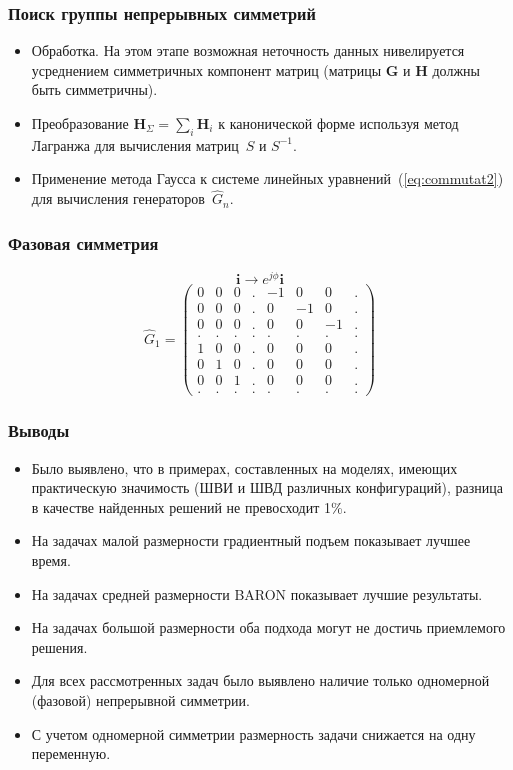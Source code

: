 \begin{frame}
    \frametitle{Поиск группы непрерывных симметрий}
    \begin{itemize}
      \item Обработка. На этом этапе возможная неточность данных нивелируется усреднением симметричных компонент матриц (матрицы $\textbf{G}$ и $\textbf{H}$ должны быть симметричны).
      \item %
      Преобразование $ {\textbf{H}}_{\Sigma} = \sum_{i} \textbf{H}_i$ к канонической форме используя метод Лагранжа для вычисления матриц~$S$ и $S^{-1} $.
      \item Применение метода Гаусса к системе линейных уравнений~(\ref{eq:commutat2}) для вычисления генераторов~$\hat{G}_n$.
    \end{itemize}
\end{frame}

\begin{frame}
    \frametitle{Фазовая симметрия}
    $$\textbf{i} \to e^{{j}\phi}\textbf{i}$$
    \vspace{2em}
    $$
    \hat{G}_1 =
    \left(
    \begin{array}{cccccccc}
      0 & 0 & 0 & . & -1 & 0 & 0 & . \\
      0 & 0 & 0 & . & 0 & -1 & 0 & . \\
      0 & 0 & 0 & . & 0 & 0 & -1 & . \\
      . & . & . & . & . & . & . & . \\
      1 & 0 & 0 & . & 0 & 0 & 0 & . \\
      0 & 1 & 0 & . & 0 & 0 & 0 & . \\
      0 & 0 & 1 & . & 0 & 0 & 0 & . \\
      . & . & . & . & . & . & . & .
    \end{array}
    \right)
    $$
\end{frame}

\begin{frame}
    \frametitle{Выводы}
    \begin{itemize}
      \item Было выявлено, что в примерах, составленных на моделях, имеющих практическую значимость (ШВИ и ШВД различных конфигураций), разница в качестве найденных решений не превосходит 1\%. %
      \item На задачах малой размерности градиентный подъем показывает лучшее время.
      \item На задачах средней размерности BARON показывает лучшие результаты.
      \item На задачах большой размерности оба подхода могут не достичь приемлемого решения.
      \item Для всех рассмотренных задач было выявлено наличие только одномерной (фазовой) непрерывной симметрии.
      \item С учетом одномерной симметрии размерность задачи снижается на одну переменную.
    \end{itemize}
\end{frame}

